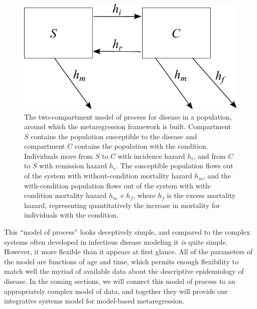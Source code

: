 \begin{figure}[h]
\begin{center}
\includegraphics[width=5in]{SC.pdf}
\caption{The two-compartment model of process for disease in a
  population, around which the metaregression framework is
  built. Compartment $S$ contains the population susceptible to the
  disease and compartment $C$ contains the population with the
  condition. Individuals move from $S$ to $C$ with incidence hazard $h_i$,
  and from $C$ to $S$ with remission hazard $h_r$. The susceptible
  population flows out of the system with without-condition mortality
  hazard $h_m$, and the with-condition population flows out of the system
  with with-condition mortality hazard $h_m+h_f$, where $h_f$ is the excess
  mortality hazard, representing quantitatively the increase in
  mortality for individuals with the condition.}
\label{forward-sim-two-compartment}
\end{center}
\end{figure}


This ``model of process'' looks deceptively simple, and compared to
the complex systems often developed in infectious disease modeling it
\emph{is} quite simple.  However, it more flexible than it appears at
first glance.  All of the parameters of the model are functions of
age and time, which permits enough flexibility to match well the
myriad of available data about the descriptive epidemiology of
disease.  In the coming sections, we will connect this model of
process to an appropriately complex model of data, and together they
will provide our integrative systems model for model-based
metaregression.

